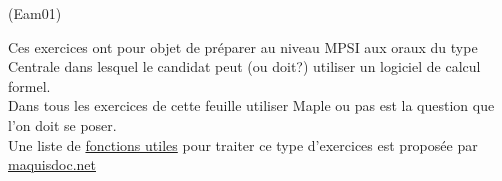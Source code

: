 \begin{tiny}(Eam01)\end{tiny}
Ces exercices ont pour objet de préparer au niveau MPSI aux oraux du type Centrale dans lesquel le candidat peut (ou doit?) utiliser un logiciel de calcul formel.\\
Dans tous les exercices de cette feuille utiliser Maple ou pas est la question que l'on doit se poser.\\
Une liste de \href{http://back.maquisdoc.net/data/maple_nicolair/oralcentr.pdf}{fonctions utiles} pour traiter ce type d'exercices est proposée par \href{http://back.maquisdoc.net/}{maquisdoc.net}
